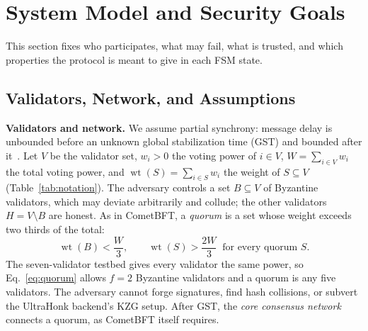\section{System Model and Security Goals}
\label{sec:model}

This section fixes who participates, what may fail, what is trusted, and which
properties the protocol is meant to give in each FSM state.

\subsection{Validators, Network, and Assumptions}
\label{subsec:threat-model}

\textbf{Validators and network.} We assume partial synchrony: message delay
is unbounded before an unknown global stabilization time (GST) and bounded
after it~\cite{dwork1988consensus}. Let $V$ be the validator set, $w_i > 0$
the voting power of $i \in V$, $W = \sum_{i \in V} w_i$ the total voting
power, and $\operatorname{wt}(S) = \sum_{i \in S} w_i$ the weight of
$S \subseteq V$ (Table~\ref{tab:notation}). The adversary controls a set
$B \subseteq V$ of Byzantine validators, which may deviate arbitrarily and
collude; the other validators $H = V \setminus B$ are honest. As in
CometBFT, a \emph{quorum} is a set whose weight exceeds two thirds of the
total:
\begin{equation}
\operatorname{wt}(B) < \frac{W}{3}, \qquad
\operatorname{wt}(S) > \frac{2W}{3} \ \text{ for every quorum } S.
\label{eq:quorum}
\end{equation}
The seven-validator testbed gives every validator the same power, so
Eq.~\eqref{eq:quorum} allows $f{=}2$ Byzantine validators and a quorum is any
five validators. The adversary cannot forge signatures, find hash collisions,
or subvert the UltraHonk backend's KZG setup. After GST, the \emph{core
consensus network} connects a quorum, as CometBFT itself requires.

